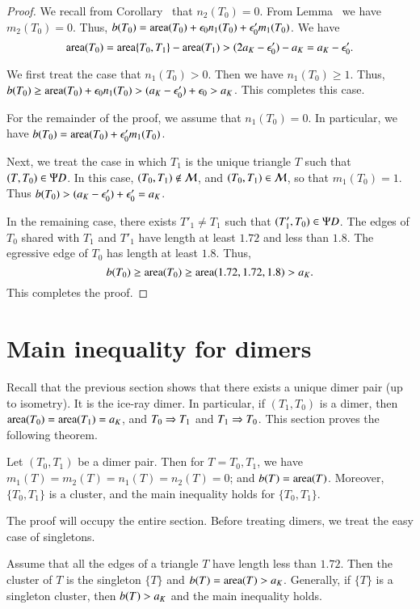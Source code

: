\begin{proof}
We recall from Corollary~ that $n_2(T_0)=0$.  From Lemma~ we
have $m_2(T_0)=0$.  Thus, $b(T_0) = {\operatorname{area}}(T_0) + \epsilon_0 n_1(T_0) + \epsilon_0' m_1(T_0)$.
We have
\[
{\operatorname{area}}(T_0) = {\operatorname{area}}\{T_0,T_1\} - {\operatorname{area}}(T_1) > (2a_K-\epsilon_0') -a_K = a_K - \epsilon_0'.
\]

We first treat the case that $n_1(T_0)>0$.  Then we have $n_1(T_0)\ge 1$.
Thus, $b(T_0) \ge {\operatorname{area}}(T_0) + \epsilon_0 n_1(T_0) > (a_K - \epsilon_0') + \epsilon_0 > a_K$.
This completes this case.  

For the remainder of the proof, we assume that $n_1(T_0)=0$.  In particular, we have
$b(T_0) = {\operatorname{area}}(T_0) + \epsilon_0' m_1(T_0)$.

Next, we treat the case in which $T_1$ is the unique triangle $T$ such that $(T,T_0)\in\Psi D$.
In this case, $(T_0,T_1)\not\in\mathcal M$, and $(T_0,T_1)\in\mathcal M$, so that $m_1(T_0)=1$.  Thus
$b(T_0) > (a_K-\epsilon_0') + \epsilon_0' = a_K$.

In the remaining case, there exists $T'_1\ne T_1$ such that $(T'_1,T_0)\in\Psi D$.  The edges of
$T_0$ shared with $T_1$ and $T'_1$ have length at least $1.72$ and less than $1.8$.  The
egressive edge of $T_0$ has length at least $1.8$.  Thus,
\[
b(T_0) \ge {\operatorname{area}} (T_0) \ge {\operatorname{area}}(1.72,1.72,1.8) > a_K.
\]
This completes the proof.
\end{proof}


\section{Main inequality for dimers}

Recall that
the previous section shows that there exists a unique dimer pair (up to isometry).
It is the ice-ray dimer.  In particular, if $(T_1,T_0)$ is a dimer, then 
${\operatorname{area}}(T_0)={\operatorname{area}}(T_1)=a_K$, and $T_0\Rightarrow T_1$ and $T_1\Rightarrow T_0$.
This section proves the following theorem.

\begin{theorem} Let $(T_0,T_1)$ be a dimer pair.  Then for $T=T_0,T_1$,
we have $m_1(T)=m_2(T) = n_1(T)=n_2(T) = 0$; and $b(T) = {\operatorname{area}}(T)$.
Moreover, $\{T_0,T_1\}$ is a cluster, and the main inequality holds for
$\{T_0,T_1\}$.
\end{theorem}

The proof will occupy the entire section.  Before treating dimers, we treat the
easy case of singletons.

\begin{lemma}  Assume that all the edges of a triangle $T$ have length less than $1.72$.
Then the cluster of $T$ is the singleton $\{T\}$ and $b(T) ={\operatorname{area}}(T) > a_K$.  Generally,
if $\{T\}$ is a singleton cluster, then $b(T) > a_K$ and the main inequality holds.
\end{lemma}

